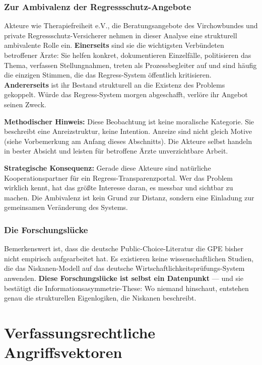 \documentclass{umbruch-position}
\begin{document}
\subsubsection*{Zur Ambivalenz der Regressschutz-Angebote}

Akteure wie Therapiefreiheit e.V., die Beratungsangebote des Virchowbundes und private Regressschutz-Versicherer nehmen in dieser Analyse eine strukturell ambivalente Rolle ein. \textbf{Einerseits} sind sie die wichtigsten Verbündeten betroffener Ärzte: Sie helfen konkret, dokumentieren Einzelfälle, politisieren das Thema, verfassen Stellungnahmen, treten als Prozessbegleiter auf und sind häufig die einzigen Stimmen, die das Regress-System öffentlich kritisieren. \textbf{Andererseits} ist ihr Bestand strukturell an die Existenz des Problems gekoppelt. Würde das Regress-System morgen abgeschafft, verlöre ihr Angebot seinen Zweck.

\textbf{Methodischer Hinweis:} Diese Beobachtung ist keine moralische Kategorie. Sie beschreibt eine Anreizstruktur, keine Intention. Anreize sind nicht gleich Motive (siehe Vorbemerkung am Anfang dieses Abschnitts). Die Akteure selbst handeln in bester Absicht und leisten für betroffene Ärzte unverzichtbare Arbeit.

\textbf{Strategische Konsequenz:} Gerade diese Akteure sind natürliche Kooperationspartner für ein Regress-Transparenzportal. Wer das Problem wirklich kennt, hat das größte Interesse daran, es messbar und sichtbar zu machen. Die Ambivalenz ist kein Grund zur Distanz, sondern eine Einladung zur gemeinsamen Veränderung des Systems.

\subsubsection{Die Forschungslücke}

Bemerkenswert ist, dass die deutsche Public-Choice-Literatur die GPE bisher nicht empirisch aufgearbeitet hat. Es existieren keine wissenschaftlichen Studien, die das Niskanen-Modell auf das deutsche Wirtschaftlichkeitsprüfungs-System anwenden. \textbf{Diese Forschungslücke ist selbst ein Datenpunkt} — und sie bestätigt die Informations\-asymmetrie-These: Wo niemand hinschaut, entstehen genau die strukturellen Eigenlogiken, die Niskanen beschreibt.


\section{Verfassungsrechtliche Angriffsvektoren}
\end{document}
